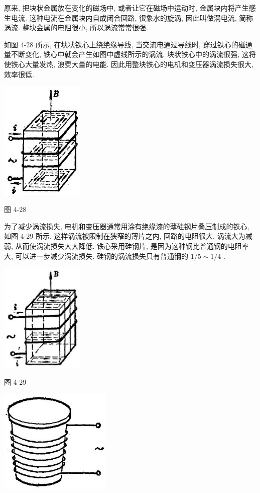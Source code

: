 \documentclass[10pt]{article}
\begin{document}
原来, 把块状金属放在变化的磁场中, 或者让它在磁场中运动时, 金属块内将产生感生电流. 这种电流在金属块内自成闭合回路, 很象水的旋涡, 因此叫做涡电流, 简称涡流. 整块金属的电阻很小, 所以涡流常常很强.

如图 4-28 所示, 在块状铁心上绕绝缘导线, 当交流电通过导线时, 穿过铁心的磁通量不断变化, 铁心中就会产生如图中虚线所示的涡流. 块状铁心中的涡流很强, 这将使铁心大量发热, 浪费大量的电能. 因此用整块铁心的电机和变压器涡流损失很大, 效率很低.

\begin{center}
\includegraphics[max width=0.3\textwidth]{images/01913056-1f15-74d8-9184-9aab52c9d66b_153_965679.jpg}
\end{center}

图 4-28

为了减少涡流损失, 电机和变压器通常用涂有绝缘漆的薄硅钢片叠压制成的铁心, 如图 4-29 所示. 这样涡流被限制在狭窄的薄片之内, 回路的电阻很大, 涡流大为减弱, 从而使涡流损失大大降低. 铁心采用硅钢片, 是因为这种钢比普通钢的电阻率大, 可以进一步减少涡流损失. 硅钢的涡流损失只有普通钢的 \(1/5 \sim 1/4\) .

\begin{center}
\includegraphics[max width=0.3\textwidth]{images/01913056-1f15-74d8-9184-9aab52c9d66b_153_212203.jpg}
\end{center}

图 4-29

\begin{center}
\includegraphics[max width=0.4\textwidth]{images/01913056-1f15-74d8-9184-9aab52c9d66b_153_845364.jpg}
\end{center}
\end{document}
